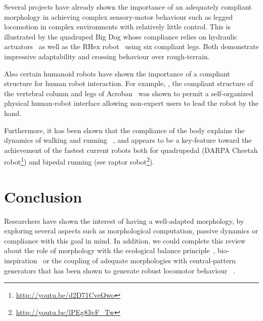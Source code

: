 Several projects have already shown the importance of an adequately compliant morphology in achieving complex sensory-motor behaviour such as legged locomotion in complex environments with relatively little control.  This is illustrated by the quadruped Big Dog whose compliance relies on hydraulic actuators~\parencite{raibert2008bigdog} as well as the RHex robot~\parencite{saranli2001rhex} using six compliant legs. Both demonstrate impressive adaptability and crossing behaviour over rough-terrain.

\begin{figure}[tb]
\centering
    \hfil
    \caption{}
    \label{fig:compliant_robot}
\end{figure}

Also certain humanoid robots have shown the importance of a compliant structure for human robot interaction. For example,  , the compliant structure of the vertebral column and legs of Acroban~\parencite{ly2011bio} \parencite{Oudeyer2011} was shown to permit a self-organized physical human-robot interface allowing non-expert users to lead the robot by the hand.

Furthermore, it has been shown that the compliance of the body explains the dynamics of walking and running~\parencite{Geyer2006} \parencite{iida2007bipedal}, and appears to be a key-feature toward the achievement of the fastest current robots both for quadrupedal (DARPA Cheetah robot\footnote{\url{http://youtu.be/d2D71CveQwo}}) and bipedal running (see raptor robot\footnote{\url{http://youtu.be/lPEg83vF_Tw}}).



\section{Conclusion} %

Researchers have shown the interest of having a well-adapted morphology, by exploring several aspects such as morphological computation, passive dynamics or compliance with this goal in mind. In addition, we could complete this review about the role of morphology with the ecological balance principle~\parencite{pfeifer2005new}, bio-inspiration~\parencite{scarfogliero2009use} \parencite{Pfeifer07} or the coupling of adequate morphologies with central-pattern generators that has been shown to generate robust locomotor behaviour~\parencite{ijspeert2007swimming} \parencite{steingrube2010self}.

